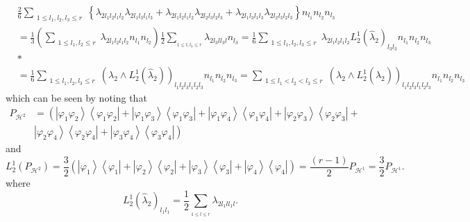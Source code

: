 \documentclass[aps,preprint]{revtex4}%
\begin{document}
\begin{align*}
&  \frac{2}{6}\sum_{\substack{1\leq l_{1},l_{2},l_{3}\leq r}}\left\{
\lambda_{2l_{1}l_{2}l_{1}l_{2}}\lambda_{2l_{1}l_{3}l_{1}l_{3}}+\lambda
_{2l_{1}l_{2}l_{1}l_{2}}\lambda_{2l_{2}l_{3}l_{2}l_{3}}+\lambda_{2l_{1}%
l_{3}l_{1}l_{3}}\lambda_{2l_{2}l_{3}l_{2}l_{3}}\right\}  n_{l_{1}}n_{l_{2}%
}n_{l_{3}}\\
&  =\frac{1}{3}\left(  \sum_{\substack{1\leq l_{1},l_{2}\leq r}}\lambda
_{2l_{1}l_{2}l_{1}l_{2}}n_{l_{1}}n_{l_{2}}\right)  \frac{1}{2}\sum_{_{1\leq
l,l_{3}\leq r}}\lambda_{2l_{3}ll_{3}l}n_{l_{3}}=\frac{1}{6}\sum
_{\substack{1\leq l_{1},l_{2},l_{3}\leq r}}\lambda_{2l_{1}l_{2}l_{1}l_{2}%
}L_{2}^{1}\left(  \hat{\lambda}_{2}\right)  _{l_{3}l_{3}}n_{l_{1}}n_{l_{2}%
}n_{l_{3}}\\
&  \ast\\
&  =\frac{1}{6}\sum_{\substack{1\leq l_{1},l_{2},l_{3}\leq r}}\left(
\lambda_{2}\wedge L_{2}^{1}\left(  \hat{\lambda}_{2}\right)  \right)
_{l_{1}l_{2}l_{3}l_{1}l_{2}l_{3}}n_{l_{1}}n_{l_{2}}n_{l_{3}}=\sum
_{\substack{1\leq l_{1}<l_{2}<l_{3}\leq r}}\left(  \lambda_{2}\wedge L_{2}%
^{1}\left(  \hat{\lambda}_{2}\right)  \right)  _{l_{1}l_{2}l_{3}l_{1}%
l_{2}l_{3}}n_{l_{1}}n_{l_{2}}n_{l_{3}}%
\end{align*}
which can be seen by noting that
\begin{align*}
P_{\mathcal{H}^{2}}  &  =\left(  \left\vert \varphi_{1}\varphi_{2}%
\right\rangle \left\langle \varphi_{1}\varphi_{2}\right\vert +\left\vert
\varphi_{1}\varphi_{3}\right\rangle \left\langle \varphi_{1}\varphi
_{3}\right\vert +\left\vert \varphi_{1}\varphi_{4}\right\rangle \left\langle
\varphi_{1}\varphi_{4}\right\vert +\left\vert \varphi_{2}\varphi
_{3}\right\rangle \left\langle \varphi_{2}\varphi_{3}\right\vert \right.  +\\
&  \left.  \left\vert \varphi_{2}\varphi_{4}\right\rangle \left\langle
\varphi_{2}\varphi_{4}\right\vert +\left\vert \varphi_{3}\varphi
_{4}\right\rangle \left\langle \varphi_{3}\varphi_{4}\right\vert \right)
\end{align*}
and
\[
L_{2}^{1}\left(  P_{\mathcal{H}^{2}}\right)  =\frac{3}{2}\left(  \left\vert
\varphi_{1}\right\rangle \left\langle \varphi_{1}\right\vert +\left\vert
\varphi_{2}\right\rangle \left\langle \varphi_{2}\right\vert +\left\vert
\varphi_{3}\right\rangle \left\langle \varphi_{3}\right\vert +\left\vert
\varphi_{4}\right\rangle \left\langle \varphi_{4}\right\vert \right)
=\frac{\left(  r-1\right)  }{2}P_{\mathcal{H}^{1}}=\frac{3}{2}P_{\mathcal{H}%
^{1}}.
\]
where
\[
L_{2}^{1}\left(  \hat{\lambda}_{2}\right)  _{l_{1}l_{1}}=\frac{1}{2}%
\sum_{_{1\leq l\leq r}}\lambda_{2l_{1}ll_{1}l}.
\]
\end{document}

